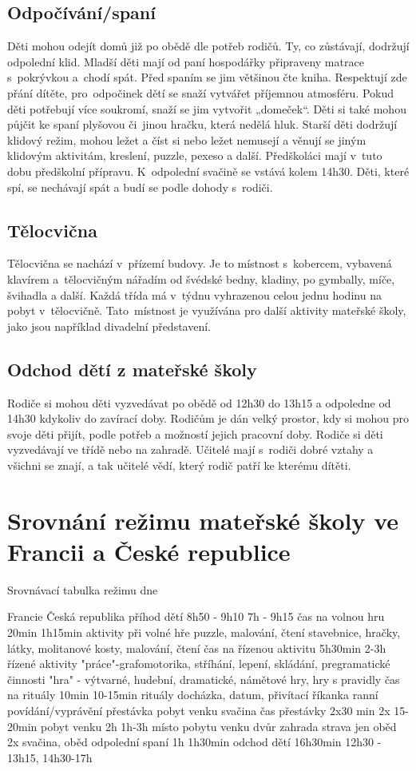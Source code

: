 		\subsection{Odpočívání/spaní}
			Děti mohou odejít domů již po obědě dle potřeb rodičů. Ty, co zůstávají, dodržují odpolední klid. Mladší děti mají 	od paní hospodářky připraveny matrace s pokrývkou a chodí spát. Před spaním se jim většinou čte kniha. Respektují zde přání dítěte, pro odpočinek dětí se snaží vytvářet příjemnou atmosféru. Pokud děti potřebují více soukromí, snaží se jim vytvořit „domeček“. Děti si také mohou půjčit ke spaní plyšovou či jinou hračku, která nedělá hluk. Starší děti dodržují klidový režim, mohou ležet a číst si nebo ležet nemusejí a věnují se jiným klidovým aktivitám, kreslení, puzzle, pexeso a další.  Předškoláci mají v tuto dobu předškolní přípravu. K odpolední svačině se vstává kolem 14h30. Děti, které spí, se nechávají spát a budí se podle dohody s rodiči.

		\subsection{Tělocvična}
			Tělocvična se nachází v přízemí budovy. Je to místnost s kobercem, vybavená klavírem a tělocvičným nářadím od švédské bedny, kladiny, po gymbally, míče, švihadla a další. Každá třída má v týdnu vyhrazenou celou jednu hodinu na pobyt v tělocvičně. Tato místnost je využívána pro další aktivity mateřské školy, jako jsou například divadelní představení. 

		\subsection{Odchod dětí z mateřské školy}
			Rodiče si mohou děti vyzvedávat po obědě od 12h30 do 13h15 a odpoledne od 14h30 kdykoliv do zavírací doby. Rodičům je dán velký prostor, kdy si mohou pro svoje děti přijít, podle potřeb a možností jejich pracovní doby. Rodiče si děti vyzvedávají ve třídě nebo na zahradě. Učitelé mají s rodiči dobré vztahy a všichni se znají, a tak učitelé vědí, který rodič patří ke kterému dítěti.

	\section{Srovnání režimu mateřské školy ve Francii a České republice}
\label{srovnani}
Srovnávací tabulka režimu dne

Francie
Česká republika
příhod dětí
8h50 - 9h10
7h - 9h15
čas na volnou hru
20min
1h15min
aktivity při volné hře
puzzle, malování, čtení
stavebnice, hračky, látky, molitanové kosty, malování, čtení
čas na řízenou aktivitu
5h30min
2-3h
řízené aktivity
"práce"-grafomotorika, stříhání, lepení, skládání, pregramatické činnosti
"hra" - výtvarné, hudební, dramatické, námětové hry, hry s pravidly
čas na rituály
10min
10-15min
rituály
docházka, datum, přivítací říkanka
ranní povídání/vyprávění
přestávka
pobyt venku
svačina
čas přestávky 
2x30 min
2x 15-20min
pobyt venku
2h
1h-3h
místo pobytu venku
dvůr
zahrada
strava
jen oběd
2x svačina, oběd
odpolední spaní
1h
1h30min
odchod dětí
16h30min
12h30 - 13h15, 14h30-17h


